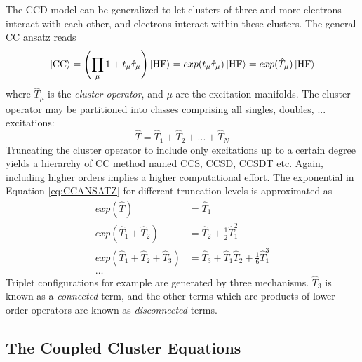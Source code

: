 The CCD model can be generalized to let clusters of three and more electrons interact with each other, and electrons interact within these clusters. The general CC ansatz reads
\begin{equation}
\ket{\text{CC}} = \left( \prod_{\mu} 1 + t_{\mu}\hat{\tau}_{\mu} \right) \ket{\text{HF}} = exp(t_{\mu}\hat{\tau}_{\mu}) \ket{\text{HF}} = exp(\hat{T}_{\mu}) \ket{\text{HF}}
\label{eq:CCANSATZ}
\end{equation}
\noindent where $\hat{T}_{\mu}$ is the \emph{cluster operator}, and $\mu$ are the excitation manifolds. The cluster operator may be partitioned into classes comprising all singles, doubles, ... excitations:
\begin{equation}
\hat{T} = \hat{T}_1 + \hat{T}_2 + ... + \hat{T}_N
\end{equation}
\noindent Truncating the cluster operator to include only excitations up to a certain degree yields a hierarchy of CC method named CCS, CCSD, CCSDT etc. Again, including higher orders implies a higher computational effort. The exponential in Equation \ref{eq:CCANSATZ} for different truncation levels is approximated as
\begin{align}
exp(\hat{T}) &= \hat{T}_1 \\
exp(\hat{T}_1 + \hat{T}_2) &= \hat{T}_2 + \frac{1}{2} \hat{T}_1^2 \\
exp(\hat{T}_1 + \hat{T}_2 + \hat{T}_3) &= \hat{T}_3 + \hat{T}_1 \hat{T}_2 + \frac{1}{6} \hat{T}_1^3 \\
\ldots \nonumber
\end{align}
\noindent Triplet configurations for example are generated by three mechanisms. $\hat{T}_3$ is known as a \emph{connected} term, and the other terms which are products of lower order operators are known as \emph{disconnected} terms. 

\subsection{The Coupled Cluster Equations} 

